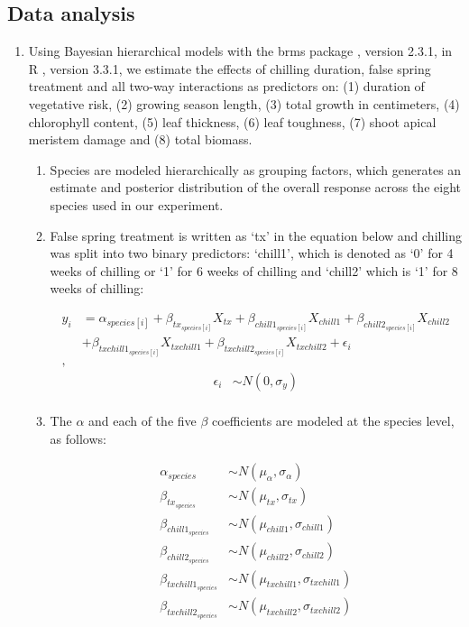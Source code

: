 \documentclass{article}\usepackage[]{graphicx}\usepackage[]{color}
\begin{document}
\subsection*{Data analysis}
\begin{enumerate}
\item Using Bayesian hierarchical models with the brms package \citep{brms}, version 2.3.1,  in R \citep{R}, version 3.3.1, we estimate the effects of chilling duration, false spring treatment and all two-way interactions as predictors on: (1) duration of vegetative risk, (2) growing season length, (3) total growth in centimeters, (4) chlorophyll content, (5) leaf thickness, (6) leaf toughness, (7) shoot apical meristem damage and (8) total biomass. %
  \begin{enumerate}
  \item Species are modeled hierarchically as grouping factors, which generates an estimate and posterior distribution of the overall response across the eight species used in our experiment.
  \item False spring treatment is written as `tx' in the equation below and chilling was split into two binary predictors: `chill1', which is denoted as `0' for 4 weeks of chilling or `1' for 6 weeks of chilling and `chill2' which is `1' for 8 weeks of chilling:

\begin{align*}
y_i &= \alpha_{species[i]} + \beta_{tx_{species[i]}}X_{tx} + \beta_{chill1_{species[i]}}X_{chill1} + \beta_{chill2_{species[i]}}X_{chill2}\\
&+ \beta_{txchill1_{species[i]}}X_{txchill1} + \beta_{txchill2_{species[i]}}X_{txchill2} + \epsilon_i \tag{1}\\,
\end{align*}
\begin{align*}
\epsilon_i & \sim N(0,\sigma_y) \\
\end{align*}

\item The $\alpha$ and each of the five $\beta$ coefficients are modeled at the species level, as follows:

\begin{align*}
\alpha_{species} & \sim N(\mu_{\alpha}, \sigma_{\alpha}) \\
\beta_{tx_{species}} & \sim N(\mu_{tx}, \sigma_{tx}) \\
\beta_{chill1_{species}} & \sim N(\mu_{chill1}, \sigma_{chill1}) \\
\beta_{chill2_{species}} & \sim N(\mu_{chill2}, \sigma_{chill2}) \\
\beta_{txchill1_{species}} & \sim N(\mu_{txchill1}, \sigma_{txchill1}) \\
\beta_{txchill2_{species}} & \sim N(\mu_{txchill2}, \sigma_{txchill2}) \\
\end{align*}


\end{enumerate}
\end{enumerate}
\end{document}
